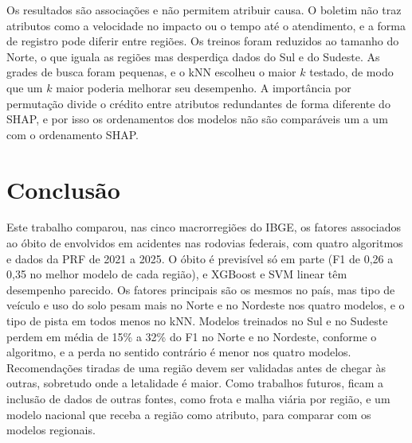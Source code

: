 \documentclass[12pt]{article}
\begin{document}
Os resultados são associações e não permitem atribuir causa. O boletim não traz atributos como a velocidade no impacto ou o
tempo até o atendimento, e a forma de registro pode diferir entre
regiões. Os treinos foram reduzidos ao tamanho do Norte, o que iguala as
regiões mas desperdiça dados do Sul e do Sudeste. As grades de busca
foram pequenas, e o kNN escolheu o maior $k$ testado, de modo que um $k$
maior poderia melhorar seu desempenho. A importância por permutação
divide o crédito entre atributos redundantes de forma diferente do SHAP,
e por isso os ordenamentos dos modelos não são comparáveis um a um com
o ordenamento SHAP.

\section{Conclusão}

Este trabalho comparou, nas cinco macrorregiões do IBGE, os fatores
associados ao óbito de envolvidos em acidentes nas rodovias federais,
com quatro algoritmos e dados da PRF de 2021 a 2025. O óbito é previsível
só em parte (F1 de 0,26 a 0,35 no melhor modelo de cada região), e
XGBoost e SVM linear têm desempenho parecido. Os fatores principais são
os mesmos no país, mas tipo de veículo e uso do solo pesam mais no Norte
e no Nordeste nos quatro modelos, e o tipo de pista em todos menos no
kNN. Modelos treinados
no Sul e no Sudeste perdem em média de 15\% a 32\% do F1 no Norte e no
Nordeste, conforme o algoritmo, e a perda no sentido contrário é menor
nos quatro modelos.
Recomendações tiradas de uma região devem ser validadas antes de chegar
às outras, sobretudo onde a letalidade é maior. Como trabalhos futuros,
ficam a inclusão de dados de outras fontes, como frota e malha viária
por região, e um modelo nacional que receba a região como atributo, para comparar
com os modelos regionais.



\end{document}
